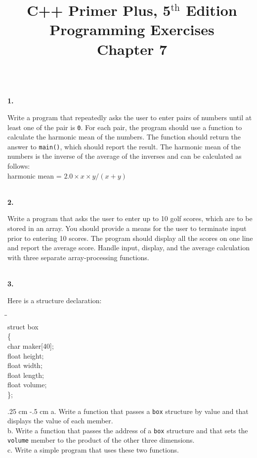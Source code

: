 \documentclass[10 pt]{amsart}
\newlength{\cwidth}
\newenvironment{cpart}[2][\cwidth]
	{\\ \phantom{\qquad}\textbf{#2. }\begin{minipage}[t]{#1}}
	{\end{minipage}}
\newcommand{\ttt}[1]{\texttt{#1}}
\newcommand{\ChapNum}{7}
\begin{document}
	\title
	[Chapter \ChapNum]
	{C++ Primer Plus, 5$^\text{th}$ Edition \\
	Programming Exercises \\
	Chapter \ChapNum}

	\maketitle

	\begin{cpart}{1}
		Write a program that repeatedly asks the user to enter pairs
		of numbers until at least one of the pair is \ttt{0}.
		For each pair, the program should use a function to calculate
		the harmonic mean of the numbers.
		The function should return the answer to \ttt{main()},
		which should report the result.
		The harmonic mean of the numbers is the inverse of the 
		average of the inverses and can be calculated as follows:\\[2ex]
		harmonic mean = $2.0 \times x \times y / (x + y)$
	\end{cpart}
	\vspace{2ex}

	\begin{cpart}{2}
		Write a program that asks the user to enter up to 10 golf
		scores, which are to be stored in an array.
		You should provide a means for the user to terminate input prior
		to entering 10 scores.
		The program should display all the scores on one line and report
		the average score.
		Handle input, display, and the average calculation with three
		separate array-processing functions.
	\end{cpart}
	\vspace{2ex}

	\begin{cpart}{3}
		Here is a structure declaration:
		{\ttfamily
			\begin{tabbing}
				\phantom{\qquad}\=\phantom{\qquad}\=\phantom{\qquad}\= \\
				struct box\\
				\{ \\
				\>	char maker[40]; \\
				\> float height; \\
				\> float width; \\
				\> float length;  \\
				\> float volume; \\
				\};
			\end{tabbing}
		}
		\vspace{2ex}
		\leftskip .25 cm
		\parindent -.5 cm
		a.
			Write a function that passes a \ttt{box} structure by 
			value and that displays the value of each member.\\

		b.
			Write a function that passes the address of a \ttt{box}
			structure and that sets the \ttt{volume} member to the product
			of the other three dimensions.\\

		c. 
			Write a simple program that uses these two functions.
	\end{cpart}
	\newpage
\end{document}
